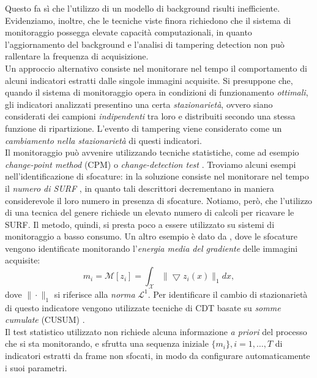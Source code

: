 Questo fa s\`i che l'utilizzo di un modello di background risulti inefficiente.
Evidenziamo, inoltre, che le tecniche viste finora richiedono che il sistema di monitoraggio possegga elevate capacit\`a computazionali, in quanto l'aggiornamento del background e l'analisi di tampering detection non pu\`o rallentare la frequenza di acquisizione.\\
Un approccio alternativo consiste nel monitorare nel tempo il comportamento di alcuni indicatori estratti dalle singole immagini acquisite.
Si presuppone che, quando il sistema di monitoraggio opera in condizioni di funzionamento \textit{ottimali}, gli indicatori analizzati presentino una certa \textit{stazionariet\`a}, ovvero siano considerati dei campioni \textit{indipendenti} tra loro e distribuiti secondo una stessa funzione di ripartizione.
L'evento di tampering viene considerato come un \textit{cambiamento nella stazionariet\`a} di questi indicatori.\\
Il monitoraggio pu\`o avvenire utilizzando tecniche statistiche, come ad esempio \textit{change-point method} (CPM) \cite{ross2011nonparametric} o \textit{change-detection test} \cite{pimentel2014review}.
Troviamo alcuni esempi nell'identificazione di sfocature: in \cite{tsesmelis2013tamper} la soluzione consiste nel monitorare nel tempo il \textit{numero di SURF} \cite{bay2006surf}, in quanto tali descrittori decrementano in maniera considerevole il loro numero in presenza di sfocature.
Notiamo, per\`o, che l'utilizzo di una tecnica del genere richiede un elevato numero di calcoli per ricavare le SURF.
Il metodo, quindi, si presta poco a essere utilizzato su sistemi di monitoraggio a basso consumo.
Un altro esempio \`e dato da \cite{alippi2010detecting}, dove le sfocature vengono identificate monitorando l'\textit{energia media del gradiente} delle immagini acquisite:
\begin{equation}
\label{eq:energyGradient}
m_i = \mathcal{M}[z_i] = \int_{\mathcal{X}}\| \bigtriangledown z_i(x) \| _1 dx,
\end{equation}  
dove $\| \cdot \|_1$ si riferisce alla \textit{norma} $\mathcal{L}^1$. 
Per identificare il cambio di stazionariet\`a di questo indicatore vengono utilizzate tecniche di CDT basate su \textit{somme cumulate} (CUSUM) \cite{alippi2008just}.\\
Il test statistico utilizzato non richiede alcuna informazione \textit{a priori} del processo che si sta monitorando, e sfrutta una sequenza iniziale $\{m_i\}, i=1,\dots,T$ di indicatori estratti da frame non sfocati, in modo da configurare automaticamente i suoi parametri. 
